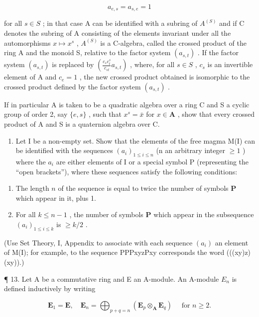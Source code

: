 \[
a _ {e, s} = a _ {s, e} = 1
\]

for all \(s \in S\) ; in that case A can be identified with a subring of \(A^{(S)}\) and if C denotes the subring of A consisting of the elements invariant under all the automorphisms \(x \mapsto x^s\) , \(A^{(S)}\) is a C-algebra, called the crossed product of the ring A and the monoid S, relative to the factor system \((a_{s,t})\) . If the factor system \((a_{s,t})\) is replaced by \(\left(\frac{c_s c_t^s}{c_{st}} a_{s,t}\right)\) , where, for all \(s \in S\) , \(c_s\) is an invertible element of A and \(c_e = 1\) , the new crossed product obtained is isomorphic to the crossed product defined by the factor system \((a_{s,t})\) .

If in particular A is taken to be a quadratic algebra over a ring C and S a cyclic group of order 2, say \(\{e, s\}\) , such that \(x^s = \bar{x}\) for \(x \in \mathbf{A}\) , show that every crossed product of A and S is a quaternion algebra over C.

\begin{enumerate}
\def\labelenumi{\arabic{enumi}.}
\setcounter{enumi}{11}
\tightlist
\item
  Let I be a non-empty set. Show that the elements of the free magma M(I) can be identified with the sequences \((a_{i})_{1 \leqslant i \leqslant n}\) (n an arbitrary integer \(\geqslant 1\) ) where the \(a_{i}\) are either elements of I or a special symbol P (representing the ``open brackets''), where these sequences satisfy the following conditions:
\end{enumerate}

\begin{enumerate}
\def\labelenumi{(\roman{enumi})}
\item
  The length \(n\) of the sequence is equal to twice the number of symbols \(\mathbf{P}\) which appear in it, plus 1.
\item
  For all \(k \leqslant n - 1\) , the number of symbols \(\mathbf{P}\) which appear in the subsequence \((a_i)_{1 \leqslant i \leqslant k}\) is \(\geqslant k / 2\) .
\end{enumerate}

(Use Set Theory, I, Appendix to associate with each sequence \((a_i)\) an element of M(I); for example, to the sequence PPPxyzPxy corresponds the word (((xy)z)(xy)).)

¶ 13. Let A be a commutative ring and E an A-module. An A-module \(E_{n}\) is defined inductively by writing

\[
\mathbf {E} _ {1} = \mathbf {E}, \quad \mathbf {E} _ {n} = \bigoplus_ {p + q = n} \left(\mathbf {E} _ {p} \otimes_ {\mathbf {A}} \mathbf {E} _ {q}\right) \quad \text { for } n \geqslant 2.
\]

